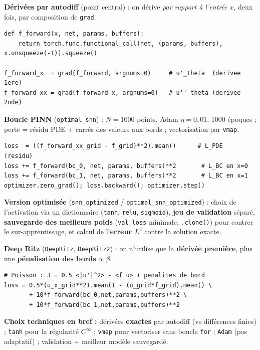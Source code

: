\documentclass[11pt]{article}
\newcommand{\key}[1]{\textbf{#1}}
\begin{document}
\textbf{Dérivées par autodiff} (point central) : on dérive \emph{par rapport à
l'entrée} $x$, deux fois, par composition de \texttt{grad}.
\begin{lstlisting}
def f_forward(x, net, params, buffers):
    return torch.func.functional_call(net, (params, buffers), x.unsqueeze(-1)).squeeze()

f_forward_x  = grad(f_forward, argnums=0)     # u'_theta  (derivee 1ere)
f_forward_xx = grad(f_forward_x, argnums=0)   # u''_theta (derivee 2nde)
\end{lstlisting}

\textbf{Boucle PINN} (\texttt{optimal\_snn}) : $N=1000$ points, Adam $\eta=0{,}01$,
1000 époques ; perte = résidu PDE + carrés des valeurs aux bords ; vectorisation
par \texttt{vmap}.
\begin{lstlisting}
loss  = ((f_forward_xx_grid - f_grid)**2).mean()      # L_PDE  (residu)
loss += f_forward(bc_0, net, params, buffers)**2       # L_BC en x=0
loss += f_forward(bc_1, net, params, buffers)**2       # L_BC en x=1
optimizer.zero_grad(); loss.backward(); optimizer.step()
\end{lstlisting}

\textbf{Version optimisée} (\texttt{snn\_optimized} / \texttt{optimal\_snn\_optimized}) :
choix de l'activation via un dictionnaire (\texttt{tanh}, \texttt{relu},
\texttt{sigmoid}), \key{jeu de validation} séparé, \key{sauvegarde des meilleurs
poids} (\texttt{val\_loss} minimale, \texttt{.clone()}) pour contrer le
sur-apprentissage, et calcul de l'\key{erreur $L^2$} contre la solution exacte.

\textbf{Deep Ritz} (\texttt{DeepRitz}, \texttt{DeepRitz2}) : on n'utilise que la
\key{dérivée première}, plus une \key{pénalisation des bords} $\alpha,\beta$.
\begin{lstlisting}
# Poisson : J = 0.5 <|u'|^2> - <f u> + penalites de bord
loss = 0.5*(u_x_grid**2).mean() - (u_grid*f_grid).mean() \
       + 10*f_forward(bc_0,net,params,buffers)**2 \
       + 10*f_forward(bc_1,net,params,buffers)**2
\end{lstlisting}

\textbf{Choix techniques en bref :} dérivées \key{exactes} par autodiff (vs
différences finies) ; \texttt{tanh} pour la régularité $C^\infty$ ; \texttt{vmap}
pour vectoriser sans boucle \texttt{for} ; \texttt{Adam} (pas adaptatif) ;
validation + meilleur modèle sauvegardé.

\end{document}
